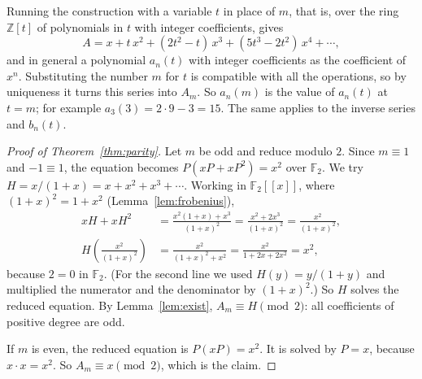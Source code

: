 \documentclass[11pt,a4paper]{article}
\theoremstyle{definition}
\theoremstyle{remark}
\newcommand{\Z}{\mathbb{Z}}
\newcommand{\F}{\mathbb{F}}
\newcommand{\ps}[1]{#1[[x]]}
\begin{document}
Running the construction with a variable $t$ in place of $m$, that is, over the ring $\Z[t]$ of polynomials in $t$ with
integer coefficients, gives
\[
A=x+t\,x^2+(2t^2-t)\,x^3+(5t^3-2t^2)\,x^4+\cdots,
\]
and in general a polynomial $a_n(t)$ with integer coefficients as the coefficient of $x^n$. Substituting the number $m$
for $t$ is compatible with all the operations, so by uniqueness it turns this series into $A_m$. So $a_n(m)$ is the value
of $a_n(t)$ at $t=m$; for example $a_3(3)=2\cdot9-3=15$. The same applies to the inverse series and $b_n(t)$.

\begin{proof}[Proof of Theorem~\ref{thm:parity}]
Let $m$ be odd and reduce modulo $2$. Since $m\equiv1$ and $-1\equiv1$, the equation becomes $P(xP+xP^2)=x^2$ over
$\F_2$. We try $H=x/(1+x)=x+x^2+x^3+\cdots$. Working in $\ps{\F_2}$, where $(1+x)^2=1+x^2$ (Lemma~\ref{lem:frobenius}),
\begin{align*}
xH+xH^2&=\frac{x^2(1+x)+x^3}{(1+x)^2}=\frac{x^2+2x^3}{(1+x)^2}=\frac{x^2}{(1+x)^2},\\
H\!\left(\frac{x^2}{(1+x)^2}\right)&=\frac{x^2}{(1+x)^2+x^2}=\frac{x^2}{1+2x+2x^2}=x^2 ,
\end{align*}
because $2=0$ in $\F_2$. (For the second line we used $H(y)=y/(1+y)$ and multiplied the numerator and the denominator
by $(1+x)^2$.) So $H$ solves the reduced equation. By Lemma~\ref{lem:exist}, $A_m\equiv H\pmod2$: all
coefficients of positive degree are odd.

If $m$ is even, the reduced equation is $P(xP)=x^2$. It is solved by $P=x$, because $x\cdot x=x^2$. So $A_m\equiv
x\pmod2$, which is the claim.
\end{proof}
\end{document}
